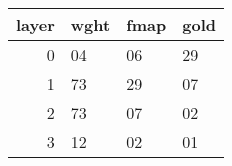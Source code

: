\begin{tabular}{rlll}
\toprule
 layer & wght & fmap & gold \\
\midrule
     0 &   04 &   06 &   29 \\
     1 &   73 &   29 &   07 \\
     2 &   73 &   07 &   02 \\
     3 &   12 &   02 &   01 \\
\bottomrule
\end{tabular}
